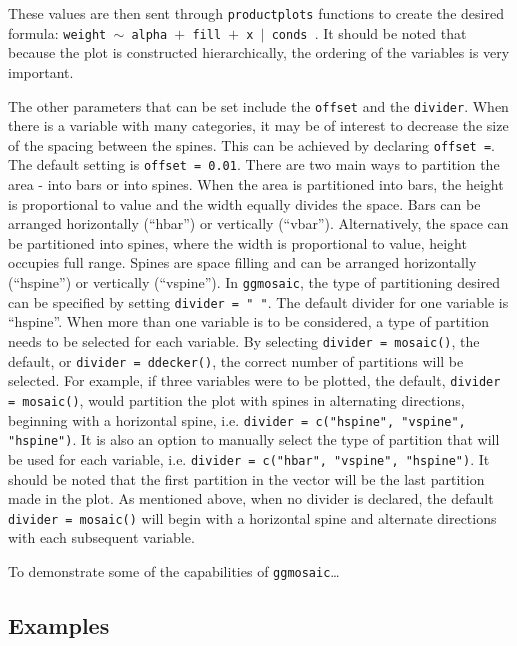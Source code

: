 These values are then sent through \texttt{productplots} functions to
create the desired formula:
\texttt{weight $\sim$ alpha $+$ fill $+$ x $|$ conds }. It should be
noted that because the plot is constructed hierarchically, the ordering
of the variables is very important.

The other parameters that can be set include the \texttt{offset} and the
\texttt{divider}. When there is a variable with many categories, it may
be of interest to decrease the size of the spacing between the spines.
This can be achieved by declaring \texttt{offset =}. The default setting
is \texttt{offset = 0.01}. There are two main ways to partition the area
- into bars or into spines. When the area is partitioned into bars, the
height is proportional to value and the width equally divides the space.
Bars can be arranged horizontally (``hbar'') or vertically (``vbar'').
Alternatively, the space can be partitioned into spines, where the width
is proportional to value, height occupies full range. Spines are space
filling and can be arranged horizontally (``hspine'') or vertically
(``vspine''). In \texttt{ggmosaic}, the type of partitioning desired can
be specified by setting \texttt{divider = " "}. The default divider for
one variable is ``hspine''. When more than one variable is to be
considered, a type of partition needs to be selected for each variable.
By selecting \texttt{divider = mosaic()}, the default, or
\texttt{divider = ddecker()}, the correct number of partitions will be
selected. For example, if three variables were to be plotted, the
default, \texttt{divider = mosaic()}, would partition the plot with
spines in alternating directions, beginning with a horizontal spine,
i.e. \texttt{divider = c("hspine", "vspine", "hspine")}. It is also an
option to manually select the type of partition that will be used for
each variable, i.e. \texttt{divider = c("hbar", "vspine", "hspine")}. It
should be noted that the first partition in the vector will be the last
partition made in the plot. As mentioned above, when no divider is
declared, the default \texttt{divider = mosaic()} will begin with a
horizontal spine and alternate directions with each subsequent variable.

To demonstrate some of the capabilities of \texttt{ggmosaic}\ldots{}

\subsection{Examples}\label{examples}

